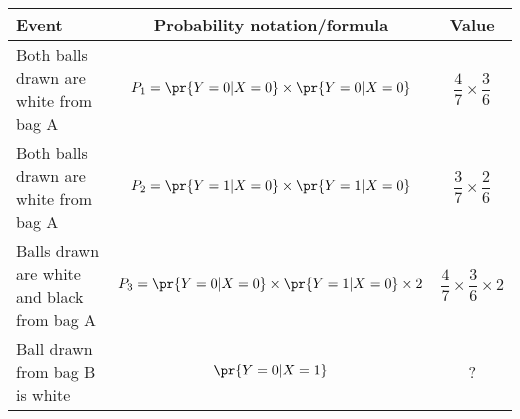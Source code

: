 \begin{tabular}{|l|c|c|}

\hline
\textbf{Event} & \textbf{Probability notation/formula} & \textbf{Value} \\
\hline
Both balls drawn are white from bag A & $P_1 = \pr{Y=0|X=0}\times\pr{Y=0|X=0}$ & $\dfrac{4}{7}\times\dfrac{3}{6}$\\ 
\hline
Both balls drawn are white from bag A & $P_2 = \pr{Y=1|X=0}\times\pr{Y=1|X=0}$ & $\dfrac{3}{7}\times\dfrac{2}{6}$\\ 
\hline
Balls drawn are white and black from bag A & $P_3 = \pr{Y=0|X=0}\times\pr{Y=1|X=0}\times2$ & $\dfrac{4}{7}\times\dfrac{3}{6}\times2$\\ 
\hline
Ball drawn from bag B is white & $\pr{Y=0|X=1}$  & ?\\ 
\hline
\end{tabular}
